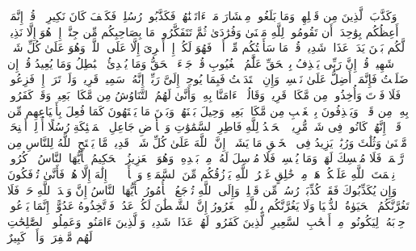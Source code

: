 \startbuffer[\q:34:45]
وَكَذَّبَ ٱلَّذِینَ مِن قَبۡلِهِمۡ وَمَا بَلَغُوا۟ مِعۡشَارَ مَاۤ ءَاتَیۡنَٰهُمۡ فَكَذَّبُوا۟ رُسُلِیۖ فَكَیۡفَ كَانَ نَكِیرِ%
\stopbuffer
\startbuffer[\q:34:46]
۞ قُلۡ إِنَّمَاۤ أَعِظُكُم بِوَٰحِدَةٍۖ أَن تَقُومُوا۟ لِلَّهِ مَثۡنَىٰ وَفُرَٰدَىٰ ثُمَّ تَتَفَكَّرُوا۟ۚ مَا بِصَاحِبِكُم مِّن جِنَّةٍۚ إِنۡ هُوَ إِلَّا نَذِیرࣱ لَّكُم بَیۡنَ یَدَیۡ عَذَابࣲ شَدِیدࣲ%
\stopbuffer
\startbuffer[\q:34:47]
قُلۡ مَا سَأَلۡتُكُم مِّنۡ أَجۡرࣲ فَهُوَ لَكُمۡۖ إِنۡ أَجۡرِیَ إِلَّا عَلَى ٱللَّهِۖ وَهُوَ عَلَىٰ كُلِّ شَیۡءࣲ شَهِیدࣱ%
\stopbuffer
\startbuffer[\q:34:48]
قُلۡ إِنَّ رَبِّی یَقۡذِفُ بِٱلۡحَقِّ عَلَّٰمُ ٱلۡغُیُوبِ%
\stopbuffer
\startbuffer[\q:34:49]
قُلۡ جَاۤءَ ٱلۡحَقُّ وَمَا یُبۡدِئُ ٱلۡبَٰطِلُ وَمَا یُعِیدُ%
\stopbuffer
\startbuffer[\q:34:50]
قُلۡ إِن ضَلَلۡتُ فَإِنَّمَاۤ أَضِلُّ عَلَىٰ نَفۡسِیۖ وَإِنِ ٱهۡتَدَیۡتُ فَبِمَا یُوحِیۤ إِلَیَّ رَبِّیۤۚ إِنَّهُۥ سَمِیعࣱ قَرِیبࣱ%
\stopbuffer
\startbuffer[\q:34:51]
وَلَوۡ تَرَىٰۤ إِذۡ فَزِعُوا۟ فَلَا فَوۡتَ وَأُخِذُوا۟ مِن مَّكَانࣲ قَرِیبࣲ%
\stopbuffer
\startbuffer[\q:34:52]
وَقَالُوۤا۟ ءَامَنَّا بِهِۦ وَأَنَّىٰ لَهُمُ ٱلتَّنَاوُشُ مِن مَّكَانِۭ بَعِیدࣲ%
\stopbuffer
\startbuffer[\q:34:53]
وَقَدۡ كَفَرُوا۟ بِهِۦ مِن قَبۡلُۖ وَیَقۡذِفُونَ بِٱلۡغَیۡبِ مِن مَّكَانِۭ بَعِیدࣲ%
\stopbuffer
\startbuffer[\q:34:54]
وَحِیلَ بَیۡنَهُمۡ وَبَیۡنَ مَا یَشۡتَهُونَ كَمَا فُعِلَ بِأَشۡیَاعِهِم مِّن قَبۡلُۚ إِنَّهُمۡ كَانُوا۟ فِی شَكࣲّ مُّرِیبِۭ%
\stopbuffer
\startbuffer[\q:35:1]
ٱلۡحَمۡدُ لِلَّهِ فَاطِرِ ٱلسَّمَٰوَٰتِ وَٱلۡأَرۡضِ جَاعِلِ ٱلۡمَلَٰۤئِكَةِ رُسُلًا أُو۟لِیۤ أَجۡنِحَةࣲ مَّثۡنَىٰ وَثُلَٰثَ وَرُبَٰعَۚ یَزِیدُ فِی ٱلۡخَلۡقِ مَا یَشَاۤءُۚ إِنَّ ٱللَّهَ عَلَىٰ كُلِّ شَیۡءࣲ قَدِیرࣱ%
\stopbuffer
\startbuffer[\q:35:2]
مَّا یَفۡتَحِ ٱللَّهُ لِلنَّاسِ مِن رَّحۡمَةࣲ فَلَا مُمۡسِكَ لَهَاۖ وَمَا یُمۡسِكۡ فَلَا مُرۡسِلَ لَهُۥ مِنۢ بَعۡدِهِۦۚ وَهُوَ ٱلۡعَزِیزُ ٱلۡحَكِیمُ%
\stopbuffer
\startbuffer[\q:35:3]
یَٰۤأَیُّهَا ٱلنَّاسُ ٱذۡكُرُوا۟ نِعۡمَتَ ٱللَّهِ عَلَیۡكُمۡۚ هَلۡ مِنۡ خَٰلِقٍ غَیۡرُ ٱللَّهِ یَرۡزُقُكُم مِّنَ ٱلسَّمَاۤءِ وَٱلۡأَرۡضِۚ لَاۤ إِلَٰهَ إِلَّا هُوَۖ فَأَنَّىٰ تُؤۡفَكُونَ%
\stopbuffer
\startbuffer[\q:35:4]
وَإِن یُكَذِّبُوكَ فَقَدۡ كُذِّبَتۡ رُسُلࣱ مِّن قَبۡلِكَۚ وَإِلَى ٱللَّهِ تُرۡجَعُ ٱلۡأُمُورُ%
\stopbuffer
\startbuffer[\q:35:5]
یَٰۤأَیُّهَا ٱلنَّاسُ إِنَّ وَعۡدَ ٱللَّهِ حَقࣱّۖ فَلَا تَغُرَّنَّكُمُ ٱلۡحَیَوٰةُ ٱلدُّنۡیَا وَلَا یَغُرَّنَّكُم بِٱللَّهِ ٱلۡغَرُورُ%
\stopbuffer
\startbuffer[\q:35:6]
إِنَّ ٱلشَّیۡطَٰنَ لَكُمۡ عَدُوࣱّ فَٱتَّخِذُوهُ عَدُوًّاۚ إِنَّمَا یَدۡعُوا۟ حِزۡبَهُۥ لِیَكُونُوا۟ مِنۡ أَصۡحَٰبِ ٱلسَّعِیرِ%
\stopbuffer
\startbuffer[\q:35:7]
ٱلَّذِینَ كَفَرُوا۟ لَهُمۡ عَذَابࣱ شَدِیدࣱۖ وَٱلَّذِینَ ءَامَنُوا۟ وَعَمِلُوا۟ ٱلصَّٰلِحَٰتِ لَهُم مَّغۡفِرَةࣱ وَأَجۡرࣱ كَبِیرٌ%
